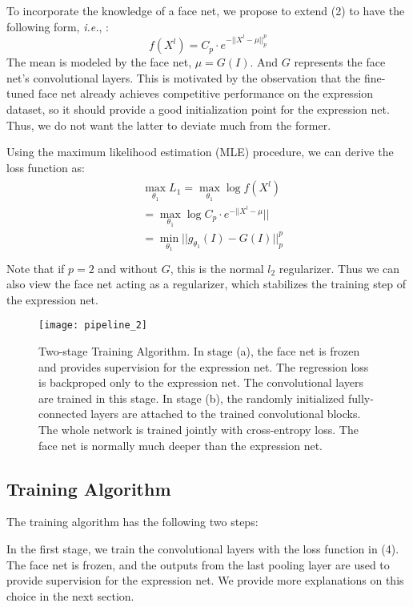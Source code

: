 \documentclass[a4paper, 10pt, conference]{ieeeconf}      %
\begin{document}
To incorporate the knowledge of a face net, we propose to extend (2) to have the following form, \emph{i.e.}, :
\begin{equation}
f(X^l) = C_p \cdot e^{-||X^l - \mu||_p^p}
\end{equation}
The mean is modeled by the face net, $\mu = G(I)$.  And $G$ represents the face net's convolutional layers. 
This is motivated by the observation that the fine-tuned face net already achieves competitive performance on the expression dataset, so it should provide a good initialization point for the expression net. Thus, we do not want the latter to deviate much from the former. 


Using the maximum likelihood estimation (MLE) procedure, we can derive the loss function as:
\begin{align}
\begin{split}
&\max_{\theta_{1}} L_1 = \max_{\theta_{1}} \log f(X^l) \\
&=\max_{\theta_{1}} \log C_p \cdot e^{-||X^l - \mu}||\\
&=\min_{\theta_{1}} ||g_{\theta_1}(I) - G(I)||_p^p\\
\end{split}
\end{align}
Note that if $p=2$ and without $G$, this is the normal $l_2$ regularizer. Thus we can also view the face net acting as a regularizer, which stabilizes the training step of the expression net.


\begin{figure}[!ht]
  \centering
  \texttt{[image: pipeline\_2]}
  \caption{Two-stage Training Algorithm. In stage (a), the face net is frozen and provides supervision for the expression net. The regression loss is backproped only to the expression net. The convolutional layers are trained in this stage. In stage (b), the randomly initialized fully-connected layers are attached to the trained convolutional blocks. The whole network is trained jointly with cross-entropy loss. The face net is normally much deeper than the expression net.}
  \label{figurelabel}
\end{figure}


\subsection{Training Algorithm}
The training algorithm has the following two steps:

In the first stage, we train the convolutional layers with the loss function in (4). The face net is frozen, and the outputs from the last pooling layer are used to provide supervision for the expression net. We provide more explanations on this choice in the next section.
\end{document}
